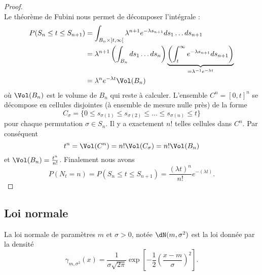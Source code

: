 \begin{proof}
\begin{equation}
	\end{equation}
	Le théorème de Fubini nous permet de décomposer l'intégrale :
	\begin{subequations}
		\begin{align}
			P(S_n\leq t\leq S_{n+1}) & =\int_{B_n\times\mathopen\rbrack t , \infty \mathclose\lbrack}\lambda^{n+1} e^{-\lambda s_{n+1}}ds_1\ldots ds_{n+1}                                           \\
			                         & =\lambda^{n+1}\left( \int_{B_n}ds_1\ldots ds_n \right)\underbrace{\left( \int_t^{\infty} e^{-\lambda s_{n+1}}ds_{n+1} \right)}_{=\lambda^{-1} e^{-\lambda t}} \\
			                         & =\lambda^n e^{-\lambda t}\Vol(B_n)
		\end{align}
	\end{subequations}
	où \( \Vol(B_n)\) est le volume de \( B_n\) qui reste à calculer. L'ensemble \( C^n=[0,t]^n\) se décompose en cellules disjointes (à ensemble de mesure nulle près) de la forme
	\begin{equation}
		C_{\sigma}=\{ 0\leq s_{\sigma(1)}\leq s_{\sigma(2)}\leq\ldots\leq s_{\sigma(n)}\leq t \}
	\end{equation}
	pour chaque permutation \( \sigma\in S_n\). Il y a exactement \( n!\) telles cellules dans \( C^n\). Par conséquent
	\begin{equation}
		t^n=\Vol(C^n)=n!\Vol(C_{\sigma})=n!\Vol(B_n)
	\end{equation}
	et \( \Vol(B_n)=\frac{ t^n }{ n! }\). Finalement nous avons
	\begin{equation}
		P(N_t=n)=P(S_n\leq t\leq S_{n+1})=\frac{ (\lambda t)^n }{ n! } e^{-(\lambda t)}.
	\end{equation}

\end{proof}
\subsection{Loi normale}

La loi normale de paramètres \( m\) et \( \sigma>0\), notée \( \dN(m,\sigma^2)\) est la loi donnée par la densité
\begin{equation}
	\gamma_{m,\sigma^2}(x)=\frac{1}{ \sigma\sqrt{2\pi} }\exp\left[ -\frac{ 1 }{2}\left( \frac{ x-m }{ \sigma } \right)^2 \right].
\end{equation}

